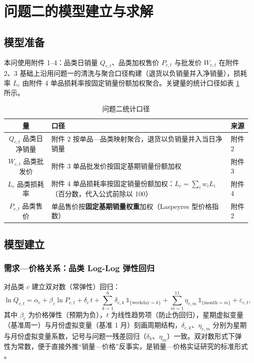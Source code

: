 \section{问题二的模型建立与求解}

\subsection{模型准备}

本问使用附件 1–4：品类日销量 $Q_{c,t}$、品类加权售价 $P_{c,t}$ 与批发价 $W_{c,t}$ 在附件 2、3 基础上沿用问题一的清洗与聚合口径构建（退货以负销量并入净销量），损耗率 $L_c$ 由附件 4 单品损耗率按固定销量份额加权聚合。关键量的统计口径如表 \ref{tab:q2_stats} 所示。

\begin{table}[htbp]
\centering
\caption{问题二统计口径}
\label{tab:q2_stats}
\begin{tabular}{cll}
\toprule
量 & 口径 & 来源 \\
\midrule
$Q_{c,t}$ 品类日净销量 & 附件 2 按单品—品类映射聚合，退货以负销量并入当日净销量 & 附件 2 \\
$W_{c,t}$ 品类批发价 & 附件 3 单品批发价按固定基期销量份额加权 & 附件 3 \\
$L_c$ 品类损耗率 & 附件 4 单品损耗率按固定销量份额加权：$L_c=\sum_i w_i L_i$（百分数，代入公式前除以 100） & 附件 4 \\
$P_{c,t}$ 品类售价 & 单品售价按\textbf{固定基期销量权重}加权（Laspeyres 型价格指数） & 附件 2 \\
\bottomrule
\end{tabular}
\end{table}

\subsection{模型建立}
\label{sec:q2_model}

\subsubsection{需求—价格关系：品类 Log-Log 弹性回归}

对品类 $c$ 建立双对数（常弹性）回归：
\begin{equation}
\ln Q_{c,t}=\alpha_c+\beta_c\ln P_{c,t}+\delta_c\,t+\sum_{k=1}^{6}\delta_{c,k}\,\mathbb{1}_{\{\mathrm{weekday}=k\}}+\sum_{m=1}^{11}\eta_{c,m}\,\mathbb{1}_{\{\mathrm{month}=m\}}+\varepsilon_{c,t},
\end{equation}
其中 $\beta_c$ 为价格弹性（预期为负），$t$ 为线性趋势项（防止伪回归），星期虚拟变量（基准周一）与月份虚拟变量（基准 1 月）刻画周期结构，$\delta_{c,k}$、$\eta_{c,m}$ 分别为星期与月份虚拟变量系数，记号与问题一残差回归（$\delta_k$、$\eta_m$）一致。双对数形式下弹性为常数，便于直接外推“销量—价格”反事实，是销量—价格实证研究的标准形式 \cite{tellis1988,hoch1995}。

